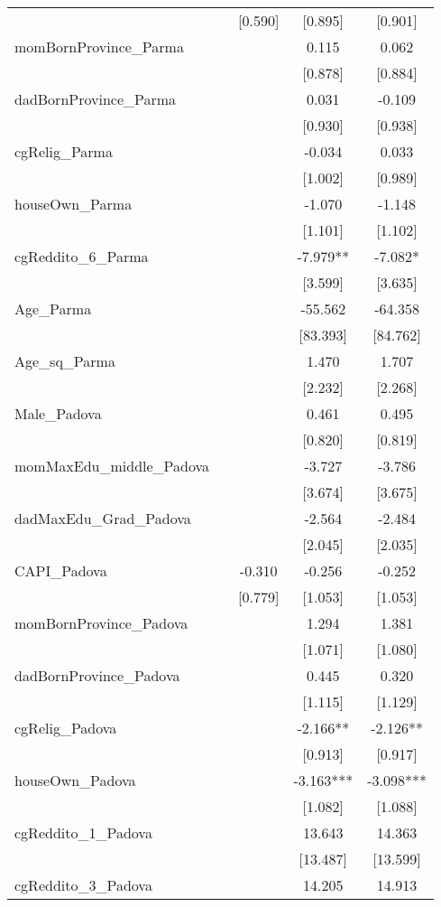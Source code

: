 \documentclass[]{article}
\begin{document}
\begin{tabular}{lcccc}
 &  & [0.590] & [0.895] & [0.901] \\
momBornProvince\_Parma &  &  & 0.115 & 0.062 \\
 &  &  & [0.878] & [0.884] \\
dadBornProvince\_Parma &  &  & 0.031 & -0.109 \\
 &  &  & [0.930] & [0.938] \\
cgRelig\_Parma &  &  & -0.034 & 0.033 \\
 &  &  & [1.002] & [0.989] \\
houseOwn\_Parma &  &  & -1.070 & -1.148 \\
 &  &  & [1.101] & [1.102] \\
cgReddito\_6\_Parma &  &  & -7.979** & -7.082* \\
 &  &  & [3.599] & [3.635] \\
Age\_Parma &  &  & -55.562 & -64.358 \\
 &  &  & [83.393] & [84.762] \\
Age\_sq\_Parma &  &  & 1.470 & 1.707 \\
 &  &  & [2.232] & [2.268] \\
Male\_Padova &  &  & 0.461 & 0.495 \\
 &  &  & [0.820] & [0.819] \\
momMaxEdu\_middle\_Padova &  &  & -3.727 & -3.786 \\
 &  &  & [3.674] & [3.675] \\
dadMaxEdu\_Grad\_Padova &  &  & -2.564 & -2.484 \\
 &  &  & [2.045] & [2.035] \\
CAPI\_Padova &  & -0.310 & -0.256 & -0.252 \\
 &  & [0.779] & [1.053] & [1.053] \\
momBornProvince\_Padova &  &  & 1.294 & 1.381 \\
 &  &  & [1.071] & [1.080] \\
dadBornProvince\_Padova &  &  & 0.445 & 0.320 \\
 &  &  & [1.115] & [1.129] \\
cgRelig\_Padova &  &  & -2.166** & -2.126** \\
 &  &  & [0.913] & [0.917] \\
houseOwn\_Padova &  &  & -3.163*** & -3.098*** \\
 &  &  & [1.082] & [1.088] \\
cgReddito\_1\_Padova &  &  & 13.643 & 14.363 \\
 &  &  & [13.487] & [13.599] \\
cgReddito\_3\_Padova &  &  & 14.205 & 14.913 \\

\end{tabular}
\end{document}
